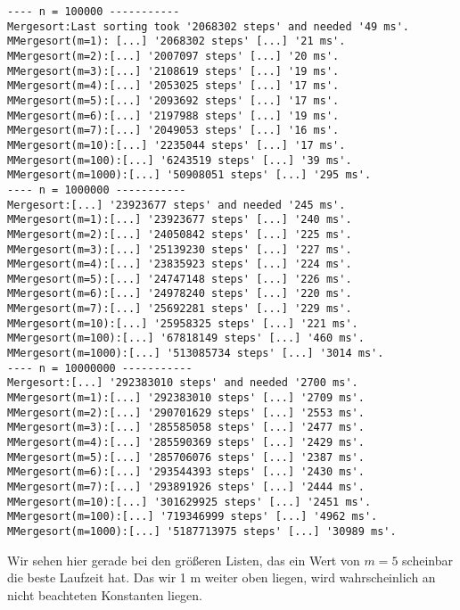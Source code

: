 \documentclass[11pt,a4paper,ngerman]{article}
\begin{document}
\begin{lstlisting}
---- n = 100000 -----------
Mergesort:Last sorting took '2068302 steps' and needed '49 ms'.
MMergesort(m=1): [...] '2068302 steps' [...] '21 ms'.
MMergesort(m=2):[...] '2007097 steps' [...] '20 ms'.
MMergesort(m=3):[...] '2108619 steps' [...] '19 ms'.
MMergesort(m=4):[...] '2053025 steps' [...] '17 ms'.
MMergesort(m=5):[...] '2093692 steps' [...] '17 ms'.
MMergesort(m=6):[...] '2197988 steps' [...] '19 ms'.
MMergesort(m=7):[...] '2049053 steps' [...] '16 ms'.
MMergesort(m=10):[...] '2235044 steps' [...] '17 ms'.
MMergesort(m=100):[...] '6243519 steps' [...] '39 ms'.
MMergesort(m=1000):[...] '50908051 steps' [...] '295 ms'.
---- n = 1000000 -----------
Mergesort:[...] '23923677 steps' and needed '245 ms'.
MMergesort(m=1):[...] '23923677 steps' [...] '240 ms'.
MMergesort(m=2):[...] '24050842 steps' [...] '225 ms'.
MMergesort(m=3):[...] '25139230 steps' [...] '227 ms'.
MMergesort(m=4):[...] '23835923 steps' [...] '224 ms'.
MMergesort(m=5):[...] '24747148 steps' [...] '226 ms'.
MMergesort(m=6):[...] '24978240 steps' [...] '220 ms'.
MMergesort(m=7):[...] '25692281 steps' [...] '229 ms'.
MMergesort(m=10):[...] '25958325 steps' [...] '221 ms'.
MMergesort(m=100):[...] '67818149 steps' [...] '460 ms'.
MMergesort(m=1000):[...] '513085734 steps' [...] '3014 ms'.
---- n = 10000000 -----------
Mergesort:[...] '292383010 steps' and needed '2700 ms'.
MMergesort(m=1):[...] '292383010 steps' [...] '2709 ms'.
MMergesort(m=2):[...] '290701629 steps' [...] '2553 ms'.
MMergesort(m=3):[...] '285585058 steps' [...] '2477 ms'.
MMergesort(m=4):[...] '285590369 steps' [...] '2429 ms'.
MMergesort(m=5):[...] '285706076 steps' [...] '2387 ms'.
MMergesort(m=6):[...] '293544393 steps' [...] '2430 ms'.
MMergesort(m=7):[...] '293891926 steps' [...] '2444 ms'.
MMergesort(m=10):[...] '301629925 steps' [...] '2451 ms'.
MMergesort(m=100):[...] '719346999 steps' [...] '4962 ms'.
MMergesort(m=1000):[...] '5187713975 steps' [...] '30989 ms'.
\end{lstlisting}

Wir sehen hier gerade bei den größeren Listen, das ein Wert von $m=5$ scheinbar die beste Laufzeit hat. Das wir 1 m weiter oben liegen, wird wahrscheinlich an nicht beachteten Konstanten liegen.

\label{LastPage}
\end{document}
